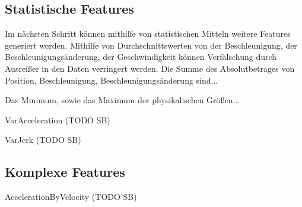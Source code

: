 \subsection{Statistische Features}
Im nächsten Schritt können mithilfe von statistischen Mitteln weitere Features generiert werden. Mithilfe von Durchschnittswerten von der Beschleunigung, der Beschleunigungsänderung, der Geschwindigkeit können Verfälschung durch Ausreißer in den Daten verringert werden. Die Summe des Absolutbetrages von Position, Beschleunigung, Beschleunigungsänderung sind...

Das Minimum, sowie das Maximum der physikalischen Größen...

VarAcceleration (TODO SB)

VarJerk (TODO SB)





\subsection{Komplexe Features}

AccelerationByVelocity (TODO SB)

